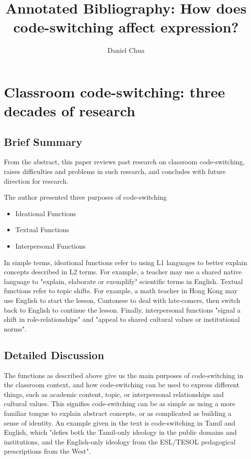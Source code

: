 \documentclass[12pt]{article}
\author{Daniel Chua}
\title{Annotated Bibliography: How does code-switching affect expression?}
\begin{document}
\maketitle

\section{Classroom code-switching: three decades of research~\cite{classroom}}

\subsection{Brief Summary}

From the abstract, this paper reviews past research on classroom code-switching, raises difficulties and problems in such research, and concludes with future direction for research.

The author presented three purposes of code-switching

\begin{itemize}
    \item Ideational Functions
    \item Textual Functions
    \item Interpersonal Functions
\end{itemize}

In simple terms, ideational functions refer to using L1 languages to better explain concepts described in L2 terms. For example, a teacher may use a shared native language to "explain, elaborate or exemplify" scientific terms in English. Textual functions refer to topic shifts. For example, a math teacher in Hong Kong may use English to start the lesson, Cantonese to deal with late-comers, then switch back to English to continue the lesson. Finally, interpersonal functions "signal a shift in role-relationships" and "appeal to shared cultural values or institutional norms".

\subsection{Detailed Discussion}

The functions as described above give us the main purposes of code-switching in the classroom context, and how code-switching can be used to express different things, such as academic content, topic, or interpersonal relationships and cultural values. This signifies code-switching can be as simple as using a more familiar tongue to explain abstract concepts, or as complicated as building a sense of identity. An example given in the text is code-switching in Tamil and English, which "defies both the Tamil-only ideology in the public domains and institutions, and the English-only ideology from the ESL/TESOL pedagogical prescriptions from the West".
\end{document}
